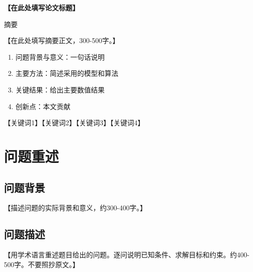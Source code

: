 \documentclass[12pt,a4paper]{ctexart}
\numberwithin{equation}{section}
\numberwithin{figure}{section}
\numberwithin{table}{section}
\begin{document}

\vspace*{2cm}
\begin{center}
{\heiti{}\textbf{【在此处填写论文标题】}}

\vspace{1.5cm}

{\heiti{}摘\quad 要}
\end{center}

\vspace{0.5cm}

{
\songti{}
【在此处填写摘要正文，300-500字。】
\begin{enumerate}
    \item 问题背景与意义：一句话说明
    \item 主要方法：简述采用的模型和算法
    \item 关键结果：给出主要数值结果
    \item 创新点：本文贡献
\end{enumerate}

\vspace{0.8cm}
【关键词1】\quad 【关键词2】\quad 【关键词3】\quad 【关键词4】
}

\newpage

\setcounter{page}{1}
\pagestyle{fancy}

\section{问题重述}

\subsection{问题背景}
【描述问题的实际背景和意义，约300-400字。】

\subsection{问题描述}
【用学术语言重述题目给出的问题。逐问说明已知条件、求解目标和约束。约400-500字。不要照抄原文。】
\end{document}
